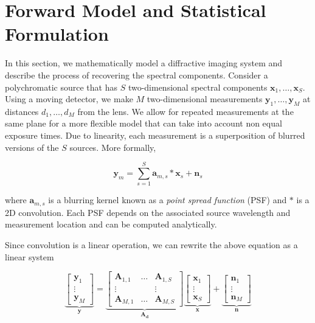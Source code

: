 \documentclass{article}
\begin{document}
\section{Forward Model and Statistical Formulation}
\label{sec:format}
In this section, we mathematically model a diffractive imaging
system and describe the process of recovering the spectral components. Consider
a polychromatic source that has $S$ two-dimensional spectral components
$\bm{x}_1, \dots, \bm{x}_S$. Using a moving detector, we make $M$
two-dimensional measurements $\bm{y}_1, \dots, \bm{y}_M$ at distances $d_1,
\dots, d_M$ from the lens. We allow for repeated measurements at the same plane
for a more flexible model that can take into account non equal exposure times.
Due to linearity, each measurement is a superposition of blurred versions
of the $S$ sources. More formally,

\begin{equation}
\bm{y}_m = \sum_{s=1}^S \bm{a}_{m,s} \ast \bm{x}_s + \bm{n}_s
\label{eq:fwd_model}
\end{equation}

where $\bm{a}_{m,s}$ is a blurring kernel known as a \emph{point spread
function} (PSF) and $\ast$ is a 2D convolution. Each PSF depends on the
associated source wavelength and measurement location and can be computed
analytically.

Since convolution is a linear operation, we can rewrite the above equation as a
linear system

\begin{equation}
  \underbrace{
    \begin{bmatrix}\bm{y}_1 \\ \vdots \\ \bm{y}_M\end{bmatrix}
  }_{\bm{y}}
  =
  \underbrace{
    \begin{bmatrix}
      \bm{A}_{1, 1} & \hdots & \bm{A}_{1, S} \\
      \vdots & & \vdots \\
      \bm{A}_{M, 1} & \hdots & \bm{A}_{M, S}
    \end{bmatrix}
  }_{\bm{A}_{\bm{d}}}
  \underbrace{
    \begin{bmatrix}\bm{x}_1 \\ \vdots \\ \bm{x}_S\end{bmatrix}
  }_{\bm{x}}
  +
  \underbrace{
    \begin{bmatrix}\bm{n}_1 \\ \vdots \\ \bm{n}_M\end{bmatrix}
  }_{\bm{n}}
\label{eq:fourier_mtx}
\end{equation}
\end{document}

